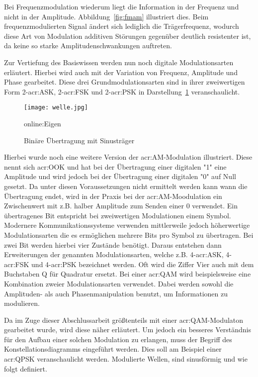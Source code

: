 Bei Frequenzmodulation wiederum liegt die Information in der Frequenz und nicht in der Amplitude. Abbildung~\ref{fig:fmam} illustriert dies. Beim frequenzmodulierten Signal ändert sich lediglich die Trägerfrequenz, wodurch diese Art von Modulation additiven Störungen gegenüber deutlich resistenter ist, da keine so starke Amplitudenschwankungen auftreten.\cite{hoeher}


Zur Vertiefung des Basiswissen werden nun noch digitale Modulationsarten erläutert. Hierbei wird auch mit der Variation von Frequenz, Amplitude und Phase gearbeitet. Diese drei Grundmodulationsarten sind in ihrer zweiwertigen Form 2-\gls{acr:ASK}, 2-\gls{acr:FSK} und 2-\gls{acr:PSK} in Darstellung~\ref{fig:welle} veranschaulicht.

\begin{figure}[H]
	\centering
	\texttt{[image: welle.jpg]}
	\caption[Binäre Übertragung mit Sinusträger]{Binäre Übertragung mit Sinusträger} 
	\cite{wernerNachrichtentechnikEinfuehrungFuer2010}\gls{online:Eigen}
	\label{fig:welle}
\end{figure}

Hierbei wurde noch eine weitere Version der \gls{acr:AM}-Modulation illustriert. Diese nennt sich \gls{acr:OOK} und hat bei der Übertragung einer digitalen "1" eine Amplitude und wird jedoch bei der Übertragung einer digitalen "0" auf Null gesetzt. Da unter diesen Voraussetzungen nicht ermittelt werden kann wann die Übertragung endet, wird in der Praxis bei der \gls{acr:AM}-Moodulation ein Zwischenwert mit z.B. halber Amplitude zum Senden einer 0 verwendet.
Ein übertragenes Bit entspricht bei zweiwertigen Modulationen einem Symbol. Modernere Kommunikationssysteme verwenden mittlerweile jedoch höherwertige Modulationsarten die es ermöglichen mehrere Bits pro Symbol zu übertragen. Bei zwei Bit werden hierbei vier Zustände benötigt. Daraus entstehen dann Erweiterungen der genannten Modulationsarten, welche z.B. 4-\gls{acr:ASK}, 4-\gls{acr:FSK} und 4-\gls{acr:PSK} bezeichnet werden. Oft wird die Ziffer Vier auch mit dem Buchstaben Q für Quadratur ersetzt.\cite{howwireless}\cite{butlerWirelessNetworkingDeveloping2013} Bei einer \gls{acr:QAM} wird beispielsweise eine Kombination zweier Modulationsarten verwendet. Dabei werden sowohl die Amplituden- als auch Phasenmanipulation benutzt, um Informationen zu modulieren. 

Da im Zuge dieser Abschlussarbeit größtenteils mit einer \gls{acr:QAM}-Modulaton gearbeitet wurde, wird diese näher erläutert. Um jedoch ein besseres Verständnis für den Aufbau einer solchen Modulation zu erlangen, muss der Begriff des Konstellationsdiagramms eingeführt werden. Dies soll am Beispiel einer \gls{acr:QPSK} veranschaulicht werden. Modulierte Wellen, sind sinusförmig und wie folgt definiert. 

